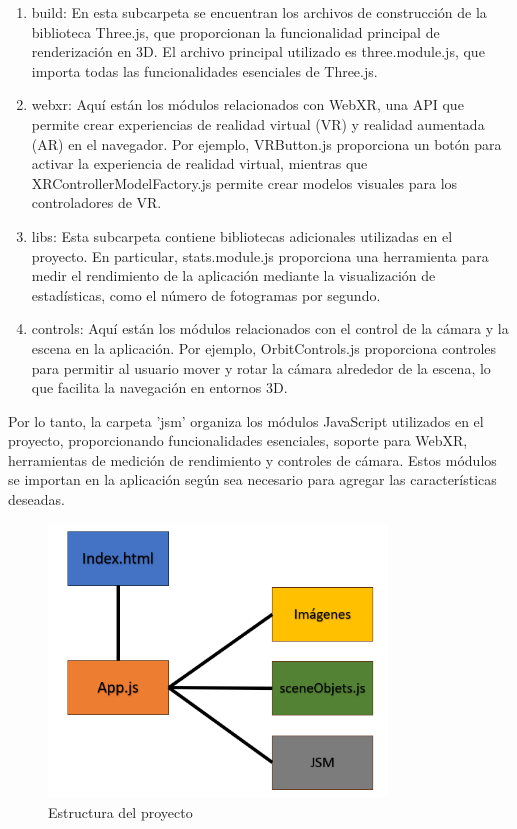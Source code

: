 \documentclass[a4paper, 12pt]{book}
\begin{document}
\begin{itemize}
  \begin{enumerate}
    \item build: En esta subcarpeta se encuentran los archivos de construcción de la biblioteca Three.js, 
    que proporcionan la funcionalidad principal de renderización en 3D. El archivo principal utilizado es three.module.js, 
    que importa todas las funcionalidades esenciales de Three.js.
    \item webxr: Aquí están los módulos relacionados con WebXR, una API que permite crear experiencias de realidad virtual (VR) y realidad aumentada (AR) en el navegador. 
    Por ejemplo, VRButton.js proporciona un botón para activar la experiencia de realidad virtual, mientras que XRControllerModelFactory.js 
    permite crear modelos visuales para los controladores de VR.
    \item libs: Esta subcarpeta contiene bibliotecas adicionales utilizadas en el proyecto. 
    En particular, stats.module.js proporciona una herramienta para medir el rendimiento de la aplicación 
    mediante la visualización de estadísticas, como el número de fotogramas por segundo.
    \item controls: Aquí están los módulos relacionados con el control de la cámara y la escena en la aplicación. 
    Por ejemplo, OrbitControls.js proporciona controles para permitir al usuario mover y rotar la cámara 
    alrededor de la escena, lo que facilita la navegación en entornos 3D.
  \end{enumerate}

  Por lo tanto, la carpeta 'jsm' organiza los módulos JavaScript utilizados en el proyecto, 
  proporcionando funcionalidades esenciales, soporte para WebXR, herramientas de medición de rendimiento y controles de cámara. 
  Estos módulos se importan en la aplicación según sea necesario para agregar las características deseadas.

\end{itemize}

\begin{figure}
  \centering
  \includegraphics[width=9cm, keepaspectratio]{img/estructura.png}
  \caption{Estructura del proyecto}
  \label{fig:arquitectura}
\end{figure}
\end{document}
